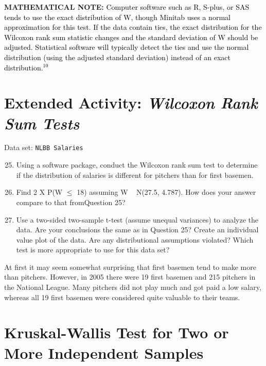 \documentclass[
]{report}
\begin{document}
\large

\textbf{MATHEMATICAL NOTE:}
\textcolor{black}{Computer software such as R, S-plus, or SAS tends to use the exact distribution of W, though Minitab uses a normal approximation for this test. If the data contain ties, the exact distribution for the Wilcoxon rank sum statistic changes and the standard deviation of W should be adjusted. Statistical software will
typically detect the ties and use the normal distribution (using the adjusted standard deviation) instead of an exact distribution.$^{10}$
}

\section*{\texorpdfstring{Extended Activity: \emph{Wilcoxon Rank Sum Tests}}{Extended Activity: Wilcoxon Rank Sum Tests}}\label{extended-activity-wilcoxon-rank-sum-tests}

Data set: \texttt{NLBB\ Salaries}

\begin{enumerate}
 \setcounter{enumi}{24}
 \item Using a software package, conduct the Wilcoxon rank sum test to determine if the distribution of salaries is different for pitchers than for first basemen.
 \item Find 2 X P(W $\leq$ 18) assuming W ~ N(27.5, 4.787). How does your answer compare to that fromQuestion 25?
 \item Use a two-sided two-sample t-test (assume unequal variances) to analyze the data. Are your conclusions the same as in Question 25? Create an individual value plot of the data. Are any distributional assumptions violated? Which test is more appropriate to use for this data set?
\end{enumerate}

\normalsize

At first it may seem somewhat surprising that first basemen tend to make more than pitchers. However, in 2005 there were 19 first basemen and 215 pitchers in the National League. Many pitchers did not play much and got paid a low salary, whereas all 19 first basemen were considered quite valuable to their teams.

\section{\texorpdfstring{\textbf{Kruskal-Wallis Test for Two or More Independent Samples}}{Kruskal-Wallis Test for Two or More Independent Samples}}\label{kruskal-wallis-test-for-two-or-more-independent-samples}
\end{document}
